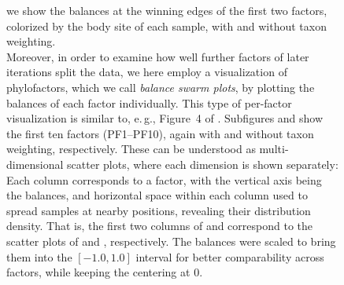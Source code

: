 \begin{figure}[!htbp]
{        we show the balances at the winning edges of the first two factors, colorized by the body site of each sample,
        with and without taxon weighting.
        \\
        Moreover, in order to examine how well further factors of later iterations split the data,
        we here employ a visualization of phylofactors, which we call \emph{balance swarm plots},
        by plotting the balances of each factor individually.
        This type of per-factor visualization is similar to, e.\,g., Figure~4 of \cite{Washburne2019}.
        Subfigures  and
         show the first ten factors
        (PF1--PF10), again with and without taxon weighting, respectively.
        These can be understood as multi-dimensional scatter plots, where each dimension is shown separately:
        Each column corresponds to a factor, with the vertical axis being the balances,
        and horizontal space within each column used to spread samples at nearby positions,
        revealing their distribution density.
        That is, the first two columns of
         and
        correspond to the scatter plots of
        and , respectively.
        The balances were scaled to bring them into the $[ -1.0, 1.0 ]$ interval for better comparability across factors,
        while keeping the centering at \num{0}.
    }
    \label{fig:hmp_pf_of_600_factor_ordination}
\end{figure}

